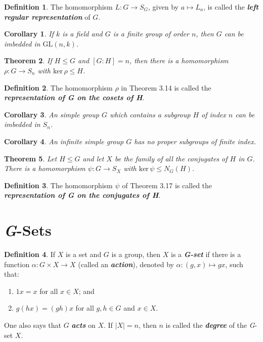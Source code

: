 \documentclass[12pt]{report}
\newtheorem{theorem}{Theorem}[chapter]
\newtheorem{corollary}[theorem]{Corollary}
\theoremstyle{definition}
\newtheorem*{definition}{Definition}
\newcommand{\term}[1]{\textbf{\textit{#1}}}
\begin{document}
\begin{definition}
	The homomorphism $L:G\to S_G$, given by $a\mapsto L_a$, is called the \term{left regular representation} of $G$.
\end{definition}

\begin{corollary}
	If $k$ is a field and $G$ is a finite group of order $n$, then $G$ can be imbedded in $\mathrm{GL}(n,k)$.
\end{corollary}

\begin{theorem}
	If $H\leq G$ and $[G:H]=n$, then there is a homomorphism $\rho:G\to S_n$ with $\mathrm{ker}\,\rho\leq H$.
\end{theorem}

\begin{definition}
	The homomorphism $\rho$ in Theorem 3.14 is called the \term{representation of G on the cosets of H}.
\end{definition}

\begin{corollary}
	An simple group $G$ which contains a subgroup $H$ of index $n$ can be imbedded in $S_n$.
\end{corollary}

\begin{corollary}
	An infinite simple group $G$ has no proper subgroups of finite index.
\end{corollary}

\begin{theorem}
	Let $H\leq G$ and let $X$ be the family of all the conjugates of $H$ in $G$. There is a homomorphism $\psi:G\to S_X$ with $\mathrm{ker}\,\psi\leq N_G(H)$.
\end{theorem}

\begin{definition}
	The homomorphism $\psi$ of Theorem 3.17 is called the \term{representation of G on the conjugates of H}.
\end{definition}

\section{\textit{G}-Sets}
\begin{definition}
	If $X$ is a set and $G$ is a group, then $X$ is a \term{G-set} if there is a function $\alpha:G\times X\to X$ (called an \term{action}), denoted by $\alpha:(g,x)\mapsto gx$, such that:
	\begin{enumerate}
		\item $1x=x$ for all $x\in X$; and
		\item $g(hx) = (gh)x$ for all $g,h\in G$ and $x\in X$.
	\end{enumerate}
	One also says that $G$ \term{acts} on $X$. If $|X|=n$, then $n$ is called the \term{degree} of the \textit{G}-set $X$.
\end{definition}
\end{document}

